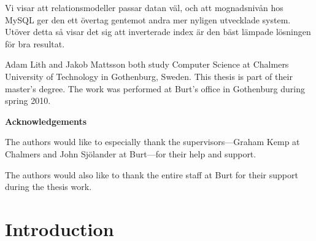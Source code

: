 Vi visar att relationsmodeller passar datan v{\"a}l, och att mognadsniv{\aa}n hos MySQL ger den ett {\"o}vertag gentemot andra mer nyligen utvecklade system. Ut{\"o}ver detta s{\aa} visar det sig att inverterade index {\"a}r den b{\"a}st l{\"a}mpade l{\"o}sningen f{\"o}r bra resultat.

\pagebreak

\vspace{12pt}

\noindent Adam Lith and Jakob Mattsson both study Computer Science at Chalmers University of Technology in Gothenburg, Sweden. This thesis is part of their master's degree. The work was performed at Burt's office in Gothenburg during spring 2010.

\vspace{24pt}

\noindent \textbf{Acknowledgements}
\vspace{12pt}

\noindent The authors would like to especially thank the supervisors---Graham Kemp at Chalmers and John Sj{\"o}lander at Burt---for their help and support.

The authors would also like to thank the entire staff at Burt for their support during the thesis work.

\pagebreak

\tableofcontents
\vfill

\pagebreak

\begin{minipage}{116mm}
    \listoffigures
\end{minipage}

\begin{minipage}{116mm}
    \listoftables
\end{minipage}

\pagebreak

\chapter{Introduction}

